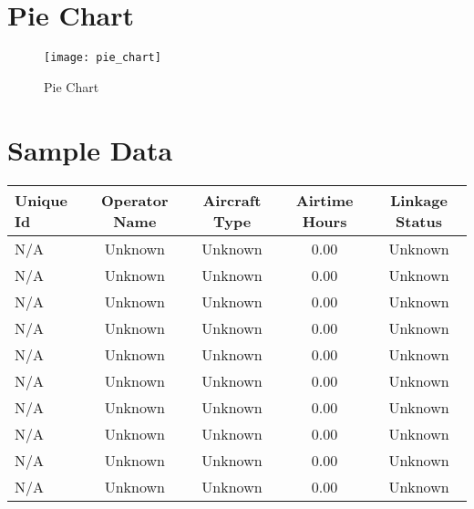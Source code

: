 \documentclass[a4paper,12pt]{article}
\begin{document}
\section*{Pie Chart}
\begin{figure}[h]
\centering
\texttt{[image: pie\_chart]}
\caption{Pie Chart}
\end{figure}

\section*{Sample Data}
\begin{longtable}{lcccc}
\toprule
Unique Id & Operator Name & Aircraft Type & Airtime Hours & Linkage Status \\
\midrule
N/A & Unknown & Unknown & 0.00 & Unknown \\
N/A & Unknown & Unknown & 0.00 & Unknown \\
N/A & Unknown & Unknown & 0.00 & Unknown \\
N/A & Unknown & Unknown & 0.00 & Unknown \\
N/A & Unknown & Unknown & 0.00 & Unknown \\
N/A & Unknown & Unknown & 0.00 & Unknown \\
N/A & Unknown & Unknown & 0.00 & Unknown \\
N/A & Unknown & Unknown & 0.00 & Unknown \\
N/A & Unknown & Unknown & 0.00 & Unknown \\
N/A & Unknown & Unknown & 0.00 & Unknown \\
\bottomrule
\end{longtable}
\end{document}
